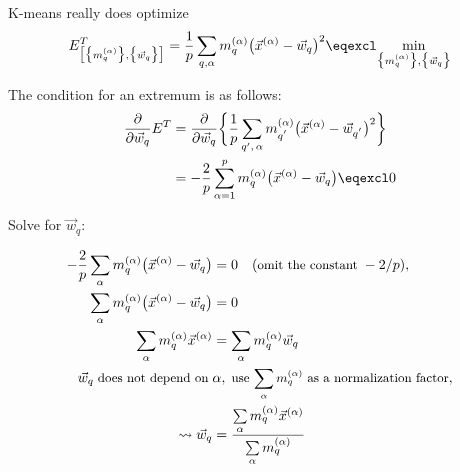 \begin{frame}{K-means really does optimize}
\begin{equation}
E_{ \big[ \big\{ m_q^{(\alpha)} \big\}, \big\{ \vec{w}_q \big\} 
		\big] }^T = \frac{1}{p} \sum\limits_{q,\alpha} m_q^{(\alpha)}
		\big( \vec{x}^{(\alpha)} - \vec{w}_q \big)^2 \eqexcl 
		\underset{\big\{ m_q^{(\alpha)} \big\}, \big\{ \vec{w}_q \big\}}{\min}
\end{equation}

The condition for an extremum is as follows:
\begin{align}
	\frac{\partial}{\partial \vec{w}_q} E^T
	&=
	\frac{\partial}{\partial \vec{w}_q} \bigg\{ \frac{1}{p} 
	\sum\limits_{q', \, \alpha} m_{q^{'}}^{(\alpha)} 
	\big( \vec{x}^{(\alpha)} - \vec{w}_{q^{'}} \big)^2 \bigg\} \\
	& = -\frac{2}{p} \sum_{\alpha=1}^{p} m_q^{(\alpha)} 
		\big( \vec{x}^{(\alpha)} - \vec{w}_q \big) \eqexcl 0
\end{align}

\end{frame}
\begin{frame}

Solve for $\vec w_q$:


\begin{align}
 -\frac{2}{p} \sum\limits_{\alpha} m_q^{(\alpha)} 
		\big( \vec{x}^{(\alpha)} - \vec{w}_q \big) &= 0 \quad (\text{\small omit the constant}\; -2/p),\\
 \sum\limits_{\alpha} m_q^{(\alpha)} 
		\big( \vec{x}^{(\alpha)} - \vec{w}_q \big) &= 0\\
 \sum\limits_{\alpha} m_q^{(\alpha)} 
		\vec{x}^{(\alpha)} &= \sum\limits_{\alpha} m_q^{(\alpha)} \vec{w}_q \\
		\vec w_q \;\text{\small does not depend on}\; &\alpha, \;\text{\small use $\sum\limits_{\alpha} m_q^{(\alpha)}$ as a normalization factor},\\
	\leadsto \vec{w}_q &= \frac{\sum\limits_{\alpha} m_q^{(\alpha)}
		\vec{x}^{(\alpha)}}{\sum\limits_{\alpha} m_q^{(\alpha)}}
\end{align}

\end{frame}

